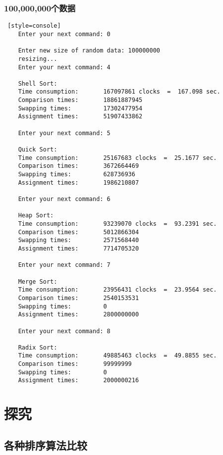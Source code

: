 \subsection{100,000,000个数据}
\begin{lstlisting} [style=console]
    Enter your next command: 0

    Enter new size of random data: 100000000
    resizing...
    Enter your next command: 4

    Shell Sort:
    Time consumption:		167097861 clocks  =  167.098 sec.
    Comparison times:		18861887945
    Swapping times:  		17302477954
    Assignment times:		51907433862

    Enter your next command: 5
    
    Quick Sort:
    Time consumption:		25167683 clocks  =  25.1677 sec.
    Comparison times:		3672664469
    Swapping times:  		628736936
    Assignment times:		1986210807
    
    Enter your next command: 6
    
    Heap Sort:
    Time consumption:		93239070 clocks  =  93.2391 sec.
    Comparison times:		5012866304
    Swapping times:  		2571568440
    Assignment times:		7714705320
    
    Enter your next command: 7
    
    Merge Sort:
    Time consumption:		23956431 clocks  =  23.9564 sec.
    Comparison times:		2540153531
    Swapping times:  		0
    Assignment times:		2800000000
    
    Enter your next command: 8
    
    Radix Sort:
    Time consumption:		49885463 clocks  =  49.8855 sec.
    Comparison times:		99999999
    Swapping times:  		0
    Assignment times:		2000000216
\end{lstlisting}

\chapter{探究}

\section{各种排序算法比较}

